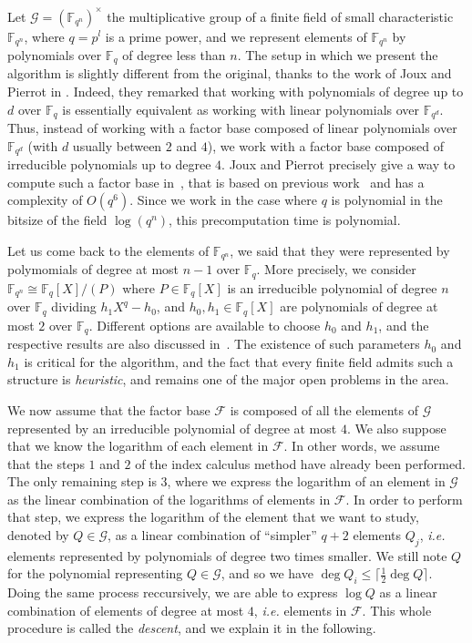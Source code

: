 \documentclass[a4paper,11pt]{article}
\theoremstyle{break}
\theoremstyle{sc}
\theoremstyle{definition}
\theoremstyle{remark}
\newcommand{\ie}{\emph{i.e. }}
\begin{document}
Let $\mathcal G = (\mathbb{F}_{q^n})^\times$ the multiplicative group of a finite
field of small characteristic $\mathbb{F}_{q^n}$, where $q=p^l$ is a prime
power, and we represent elements of $\mathbb{F}_{q^n}$ by polynomials over
$\mathbb{F}_q$ of degree less than $n$. The setup in which we present the algorithm is slightly different from
the original, thanks to the work of Joux and Pierrot in \cite{JP14}. Indeed,
they remarked that working with polynomials of degree up to $d$ over $\mathbb{F}_q$ is
essentially equivalent as working with linear polynomials over $\mathbb{F}_{q^d}$. Thus,
instead of working with a factor base composed of linear polynomials over
$\mathbb{F}_{q^d}$ (with $d$ usually between $2$ and $4$), we work with a
factor base composed of irreducible polynomials up to degree $4$. Joux and Pierrot
precisely give a way to compute such a factor base in~\cite{JP14}, that is based
on previous work~\cite{Joux13, BGJT13} and has a complexity of $O(q^6)$. Since
we work in the case where $q$ is polynomial in the bitsize of the field
$\log(q^n)$, this precomputation time is polynomial.

Let us come back to the elements of $\mathbb{F}_{q^n}$, we said that they were
represented by polymomials of degree at most $n-1$ over $\mathbb{F}_q$. More
precisely, we consider $\mathbb{F}_{q^n}\cong \mathbb{F}_{q}[X]/(P)$ where $P\in
\mathbb{F}_{q}[X]$ is an irreducible polynomial of degree $n$ over
$\mathbb{F}_{q}$ dividing $h_1X^q-h_0$, and $h_0, h_1\in \mathbb{F}_q[X]$ are
polynomials of degree at most $2$ over $\mathbb{F}_q$. Different options are
available to choose $h_0$ and $h_1$, and the respective results are also
discussed in~\cite{JP14}. The existence of such parameters $h_0$ and $h_1$ is
critical for the algorithm, and the fact that every finite field admits such a
structure is \emph{heuristic}, and remains one of the major open problems in the
area.

We now assume that the factor base $\mathcal F$ is composed of all the
elements of $\mathcal G$ represented by an irreducible polynomial of degree at
most $4$. We also suppose that we know the logarithm of each element in
$\mathcal F$. In other words, we assume that the steps $1$ and $2$ of the index
calculus method have already been performed. The only remaining step is $3$,
where we express the logarithm of an element in $\mathcal G$ as the linear
combination of the logarithms of elements in $\mathcal F$. In order to perform
that step, we express the logarithm of the element that we want to study, denoted by
$Q\in\mathcal G$, as a linear combination of ``simpler'' $q+2$ elements $Q_j$,
\ie elements represented by polynomials of degree two times smaller. We
still note $Q$ for the polynomial representing $Q\in
\mathcal G$, and so we have $\deg Q_i\leq \lceil \frac{1}{2}\deg Q\rceil$. Doing
the same process reccursively, we are able to express $\log Q$ as a linear
combination of elements of degree at most $4$, \ie elements in $\mathcal F$.
This whole procedure is called the \emph{descent}, and we explain it in the
following. 
\end{document}
